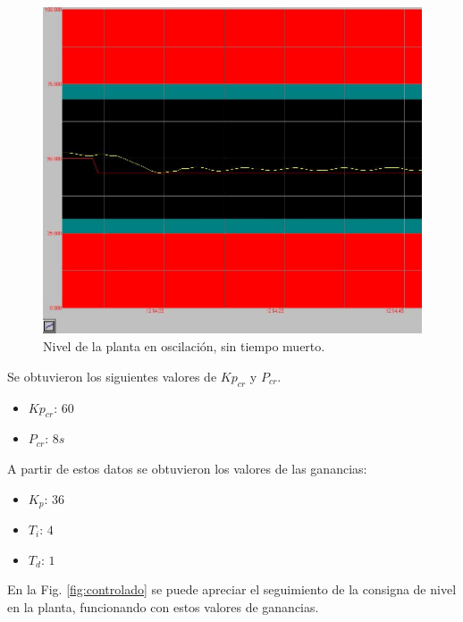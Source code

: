 \begin{figure}[ht]
 \centering
 \includegraphics[scale=0.4]{Cap4-ProgramacionPLC/images/oscperm.png}
 \caption{Nivel de la planta en oscilación, sin tiempo muerto.}
 \label{fig:oscilacionperm}
\end{figure}

Se obtuvieron los siguientes valores de $Kp_{cr} $ y $P_{cr}$.

\begin{itemize}
 \item $Kp_{cr}$:
 $60$
 \item $P_{cr}$:
 $8 s$
\end{itemize}

A partir de estos datos se obtuvieron los valores de las ganancias:

\begin{itemize}
 \item $K_p $: $36$
 \item $T_i $: $4$
 \item $T_d $: $1$ 
\end{itemize}

En la Fig. \ref{fig:controlado} se puede apreciar el seguimiento de la
consigna de nivel en la planta, funcionando con estos valores de ganancias.

